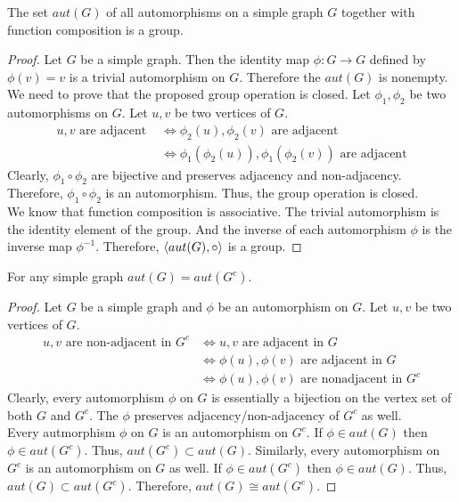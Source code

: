 \begin{theorem}
	The set $aut(G)$ of all automorphisms on a simple graph $G$ together with function composition is a group.
\end{theorem}
\begin{proof}
	Let $G$ be a simple graph. Then the identity map $\phi : G \to G$ defined by $\phi(v) = v$ is a trivial automorphism on $G$. Therefore the $aut(G)$ is nonempty.\\

	We need to prove that the proposed group operation is closed. Let $\phi_1,\phi_2$ be two automorphisms on $G$. Let $u,v$ be two vertices of $G$.
	\begin{align*}
		u,v \text{ are adjacent } 
		& \iff \phi_2(u),\phi_2(v) \text{ are adjacent}\\
		& \iff \phi_1(\phi_2(u)),\phi_1(\phi_2(v)) \text{ are adjacent}
	\end{align*}
	Clearly, $\phi_1 \circ \phi_2$ are bijective and preserves adjacency and non-adjacency. Therefore, $\phi_1 \circ \phi_2$ is an automorphism. Thus, the group operation is closed.\\

	We know that function composition is associative. The trivial automorphism is the identity element of the group. And the inverse of each automorphism $\phi$ is the inverse map $\phi^{-1}$. Therefore, $\left\langle aut(G),\circ \right\rangle$ is a group.
\end{proof}

\begin{theorem}
	For any simple graph $aut(G) = aut(G^c)$.
\end{theorem}
\begin{proof}
	Let $G$ be a simple graph and $\phi$ be an automorphism on $G$. Let $u,v$ be two vertices of $G$.
	\begin{align*}
		u,v \text{ are non-adjacent in } G^c 
		& \iff u,v \text{ are adjacent in } G \\
		& \iff \phi(u),\phi(v) \text{ are adjacent in } G \\
		& \iff \phi(u),\phi(v) \text{ are nonadjacent in } G^c
	\end{align*}
	Clearly, every automorphism $\phi$ on $G$ is essentially a bijection on the vertex set of both $G$ and $G^c$. The $\phi$ preserves adjacency/non-adjacency of $G^c$ as well.\\

	Every autmorphism $\phi$ on $G$ is an automorphism on $G^c$.
	If $\phi \in aut(G)$ then $\phi \in aut(G^c)$. Thus, $aut(G^c) \subset aut(G)$.
	Similarly, every automorphism on $G^c$ is an automorphism on $G$ as well. 
	If $\phi \in aut(G^c)$ then $\phi \in aut(G)$. Thus, $aut(G) \subset aut(G^c)$.
	Therefore, $aut(G) \cong aut(G^c)$.
\end{proof}

